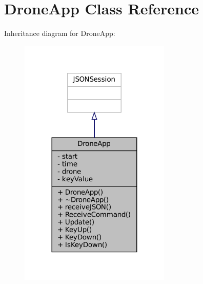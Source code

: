 \hypertarget{classDroneApp}{}\section{Drone\+App Class Reference}
\label{classDroneApp}


Inheritance diagram for Drone\+App\+:\nopagebreak
\begin{figure}[H]
\begin{center}
\leavevmode
\includegraphics[width=204pt]{classDroneApp__inherit__graph}
\end{center}
\end{figure}


